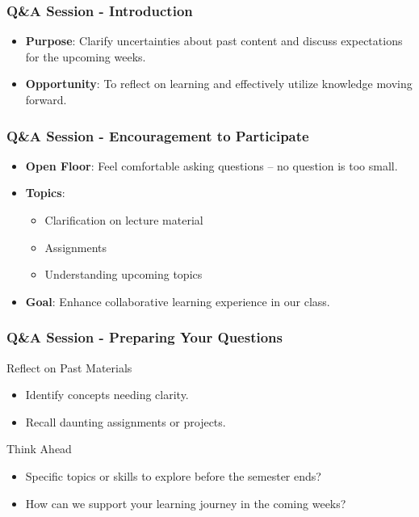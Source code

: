 \documentclass[aspectratio=169]{beamer}
\begin{document}
\begin{frame}[fragile]
    \frametitle{Q\&A Session - Introduction}
    \begin{itemize}
        \item \textbf{Purpose}: Clarify uncertainties about past content and discuss expectations for the upcoming weeks.
        \item \textbf{Opportunity}: To reflect on learning and effectively utilize knowledge moving forward.
    \end{itemize}
\end{frame}

\begin{frame}[fragile]
    \frametitle{Q\&A Session - Encouragement to Participate}
    \begin{itemize}
        \item \textbf{Open Floor}: Feel comfortable asking questions – no question is too small.
        \item \textbf{Topics}:
        \begin{itemize}
            \item Clarification on lecture material
            \item Assignments 
            \item Understanding upcoming topics
        \end{itemize}
        \item \textbf{Goal}: Enhance collaborative learning experience in our class.
    \end{itemize}
\end{frame}

\begin{frame}[fragile]
    \frametitle{Q\&A Session - Preparing Your Questions}
    \begin{block}{Reflect on Past Materials}
        \begin{itemize}
            \item Identify concepts needing clarity.
            \item Recall daunting assignments or projects.
        \end{itemize}
    \end{block}

    \begin{block}{Think Ahead}
        \begin{itemize}
            \item Specific topics or skills to explore before the semester ends?
            \item How can we support your learning journey in the coming weeks?
        \end{itemize}
    \end{block}
\end{frame}
\end{document}
